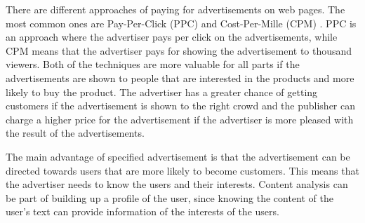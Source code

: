 There are different approaches of paying for advertisements on web pages. The most common ones are Pay-Per-Click (PPC) \cite{wiki:ppc} and Cost-Per-Mille (CPM) \cite{wiki:ppc}. PPC is an approach where the advertiser pays per click on the advertisements, while CPM means that the advertiser pays for showing the advertisement to thousand viewers. 
Both of the techniques are more valuable for all parts if the advertisements are shown to people that are interested in the products and more likely to buy the product. The advertiser has a greater chance of getting customers if the advertisement is shown to the right crowd and the publisher can charge a higher price for the advertisement if the advertiser is more pleased with the result of the advertisements.

The main advantage of specified advertisement is that the advertisement can be directed towards users that are more likely to become customers. This means that the advertiser needs to know the users and their interests. Content analysis can be part of building up a profile of the user, since knowing the content of the user's text can provide information of the interests of the users. 

